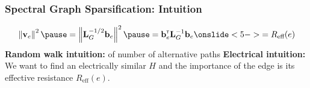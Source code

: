\documentclass{beamer}
\newcommand{\misoclasstinytitleslide}{Partially based on material by:  Rob Fergus, Nikhil Srivastava,\\[-1em] 
Yiannis Koutis, Joshua Batson, Daniel Spielman}
\begin{document}

\newcommand{\topictitle}{Spectral Graph Sparsifiers in ML}

\newcommand{\topicsubtitle}{Ridge Sparsifiers and Applications}
\renewcommand{\misoclasstinytitleslide}{Partially based on material by:  Rob Fergus, Nikhil Srivastava,\\[-1em] Yiannis Koutis, Joshua Batson, Daniel Spielman}

\MakeTopicSlide

\begin{frame}
\frametitle{Spectral Graph Sparsification: Intuition}
\bigskip
{}
\[
\norm{\bv_e}^2 \pause = \norm{\bL_G^{-1/2}\bb_e}^2 
\pause = \bb_e  \transpose \bL_G^{-1} \bb_e 
\onslide<5->{= R_{\text{eff}}(e)}
\]
\pause 
\moveb
\textbf{Random walk intuition: }  of number of alternative paths
\pause 
\moveb
\textbf{Electrical intuition: }We want to find an electrically similar $H$ and the importance 
of the edge is its effective resistance $R_{\text{eff}}(e)$.
\pause 
\moveb
{}

\end{frame}
\end{document}
